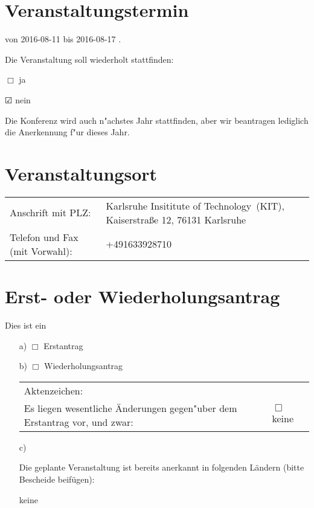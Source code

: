\documentclass{scrartcl}
\begin{document}
\section{Veranstaltungstermin}

von
\hspace{5em}
%
2016-08-11
%
\hspace{5em}
bis
\hspace{5em}
%
2016-08-17\xspace
.

Die Veranstaltung soll wiederholt stattfinden:

$\Box$
ja

$\CheckedBox$
nein

Die Konferenz wird auch n"achstes Jahr stattfinden,
aber wir beantragen lediglich die Anerkennung f"ur dieses Jahr.

\section{Veranstaltungsort}
\begin{tabu} to  0.95\textwidth { X X[2] }
Anschrift mit PLZ:               &
    Karlsruhe Insititute of Technology~(KIT), Kaiserstraße 12, 76131 Karlsruhe
    \\
Telefon und Fax (mit Vorwahl):   &
    +491633928710\\
\end{tabu}



\section{Erst- oder Wiederholungsantrag}
Dies ist ein

\begin{enumerate}
\item[a)] $\Box$  Erstantrag

\item[b)] $\Box$  Wiederholungsantrag

          \begin{tabu} to \textwidth {X X}
          Aktenzeichen:      &       \\
          Es liegen wesentliche Änderungen gegen"uber dem Erstantrag vor,
            und zwar:   &   $\Box$ keine \\
            
          \end{tabu}

\item[c)]

    Die geplante Veranstaltung ist bereits anerkannt in folgenden 
    Ländern (bitte Bescheide beifügen):

    keine

\end{enumerate}
\end{document}

